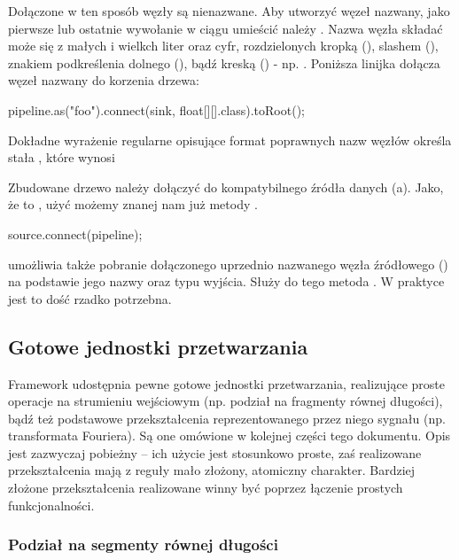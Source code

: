Dołączone w ten sposób węzły są nienazwane. Aby utworzyć węzeł nazwany, jako pierwsze lub ostatnie
wywołanie w ciągu umieścić należy . Nazwa węzła składać może się z małych i wielkch
liter oraz cyfr, rozdzielonych kropką (), slashem (\code{/}), znakiem podkreślenia dolnego
(\code{\_}), bądź kreską (\code{-}) - np. .  Poniższa linijka dołącza
węzeł nazwany  do korzenia drzewa:

\begin{java}
pipeline.as("foo").connect(sink, float[][].class).toRoot();
\end{java}

\begin{Note}
Dokładne wyrażenie regularne opisujące format poprawnych nazw węzłów określa stała
, które wynosi \\ \code{[a-zA-Z0-9]([\_./-][a-zA-Z0-9])*}
\end{Note}

Zbudowane drzewo należy dołączyć do kompatybilnego źródła danych (a). Jako, że
 to , użyć możemy znanej nam już metody .

\begin{java}
source.connect(pipeline);
\end{java}

 umożliwia także pobranie dołączonego uprzednio nazwanego węzła źródłowego
() na podstawie jego nazwy oraz typu wyjścia. Służy do tego metoda
. W praktyce jest to dość rzadko potrzebna.


\subsection{Gotowe jednostki przetwarzania}

Framework udostępnia pewne gotowe jednostki przetwarzania, realizujące proste operacje na strumieniu
wejściowym (np. podział na fragmenty równej długości), bądź też podstawowe przekształcenia
reprezentowanego przez niego sygnału (np. transformata Fouriera). Są one omówione w kolejnej części
tego dokumentu. Opis jest zazwyczaj pobieżny -- ich użycie jest stosunkowo proste, zaś realizowane
przekształcenia mają z reguły mało złożony, atomiczny charakter. Bardziej złożone przekształcenia
realizowane winny być poprzez łączenie prostych funkcjonalności.


\subsubsection{Podział na segmenty równej długości}

